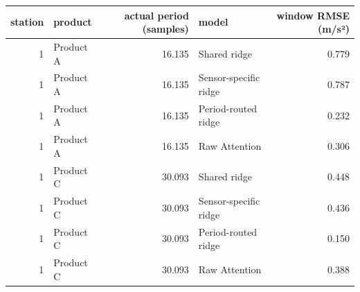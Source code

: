 \begin{tabular}{rlrlr}
\toprule
station & product & actual period (samples) & model & window RMSE (m/s²) \\
\midrule
1 & Product A & 16.135 & Shared ridge & 0.779 \\
1 & Product A & 16.135 & Sensor-specific ridge & 0.787 \\
1 & Product A & 16.135 & Period-routed ridge & 0.232 \\
1 & Product A & 16.135 & Raw Attention & 0.306 \\
1 & Product C & 30.093 & Shared ridge & 0.448 \\
1 & Product C & 30.093 & Sensor-specific ridge & 0.436 \\
1 & Product C & 30.093 & Period-routed ridge & 0.150 \\
1 & Product C & 30.093 & Raw Attention & 0.388 \\
\bottomrule
\end{tabular}
